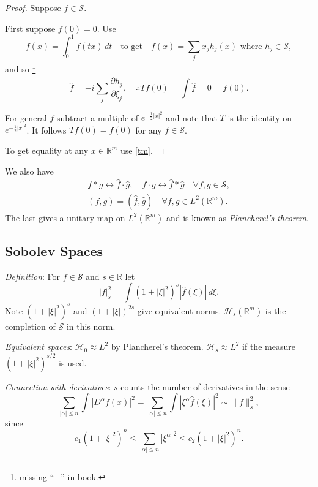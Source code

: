 \documentclass[a4paper]{amsbook}
\theoremstyle{plain}
\theoremstyle{definition}
\theoremstyle{remark}
\begin{document}
\begin{proof}
Suppose $ f \in \mathcal{S}$.  

First suppose $ f(0) = 0 $.  Use
\[
f(x) = \int_0^1 f(tx)\, dt 
\quad 
\text{to get} \quad 
f(x) = \sum_j x_j h_j(x)  \text{ where } h_j \in \mathcal{S} ,
\]
and so%
\footnote{missing ``$ - $'' in book.} 
\[
\hat{f}  = -i\sum_j \frac{\partial \hat{h}_j}{\partial \xi_j}  , \quad 
\therefore Tf(0) = \int \hat{f}  = 0 = f(0).
\]

For general $ f $ subtract a multiple of $ e^{-\frac{1}{2} |x|^ 2 }$ and note that $ T $ is the identity on $ e^{-\frac{1}{2} |x|^ 2 }$.  It follows $ Tf(0) = f(0) $ for any $ f \in \mathcal{S} $.

To get equality at any $ x \in \mathbb{R}^m $ use \eqref{tm}.
\end{proof} 

We also have
\begin{gather*}
f * g \leftrightarrow \hat{f}\cdot \hat{g}, \quad f \cdot g \leftrightarrow \hat{f}* \hat{g} \quad \forall f,g\in \mathcal{S}, \\
(f,g) = (\hat{f}, \hat{g} ) \quad \forall f,g \in L^2(\mathbb{R}^m ).
\end{gather*}
The last gives a unitary map on $ L^2( \mathbb{R}^m)$ and is known as \emph{Plancherel's theorem}.

  
 
\subsection{Sobolev Spaces} \mbox{}

\emph{Definition}:  For $ f \in \mathcal{S} $ and $ s \in \mathbb{R} $  let
\[
|f|^2_s = \int(1+|\xi|^2 )^s |\hat{f}(\xi)|\, d\xi .
\]
Note $ (1+|\xi|^2)^s $ and $ (1+|\xi|)^{2s} $ give equivalent norms.
$ \mathcal{H}_s(\mathbb{R}^m ) $ is the completion of $ \mathcal{S} $ in this norm.

\medskip
\emph{Equivalent spaces}: $ \mathcal{H}_0\approx L^2 $ by Plancherel's theorem.
$ \mathcal{H}_s\approx L^2 $ if the measure $ (1+|\xi|^2)^{s/2} $ is used.


\medskip
\emph{Connection with derivatives}:  $ s $ counts the number of derivatives in the sense 
\[
\sum_{| \alpha |\leq n} \int |D^ \alpha f(x) |^2 = \sum_{| \alpha |\leq n}  \int \left| \xi ^ \alpha \hat{f}( \xi) \right|^2 
         \sim \| f \|^2_s,
         \]
  since
  \[
  c_1(1+|\xi|^2)^n  \leq \sum_{| \alpha |\leq n} |\xi^ \alpha |^2 \leq c_2(1+|\xi|^2)^n .
  \]
  
\end{document}
